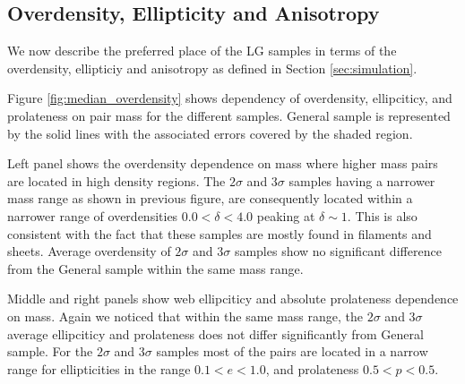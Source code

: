 \documentclass{emulateapj}
\begin{document}


\subsection{Overdensity, Ellipticity and Anisotropy}


We now describe the preferred place of the LG samples in terms of the
overdensity, ellipticiy and anisotropy as defined in Section
\ref{sec:simulation}. 

Figure \ref{fig:median_overdensity} shows dependency of overdensity,
ellipciticy, and prolateness on pair mass for the different samples.
General sample is represented by the solid lines with the associated 
errors covered by the shaded region. 

Left panel shows the overdensity dependence on mass where higher mass
pairs are located in high density regions.
The $2\sigma$ and $3\sigma$ samples having a narrower mass range as 
shown in previous figure, are consequently located within a narrower 
range of overdensities $0.0<\delta<4.0$ peaking at $\delta \sim 1$. 
This is also consistent with the fact that these samples are mostly 
found in filaments and sheets. 
Average overdensity of $2\sigma$ and $3\sigma$ samples show no 
significant difference from the General sample within the same mass 
range.  


Middle and right panels show web ellipciticy and absolute prolateness
dependence on mass. Again we noticed that within the same mass range,
the $2\sigma$ and $3\sigma$ average ellipciticy and prolateness does not
differ significantly from General sample.
For the $2\sigma$ and $3\sigma$ samples most of the pairs are located
in a narrow range for ellipticities in the range $0.1<e<1.0$, and
prolateness $0.5<p<0.5$.
\end{document}
